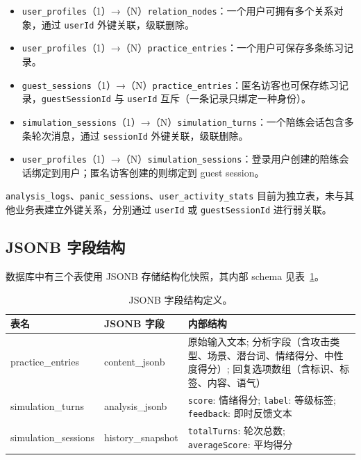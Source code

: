 \begin{itemize}
  \item \texttt{user\_profiles}（1）→（N）\texttt{relation\_nodes}：一个用户可拥有多个关系对象，通过 \texttt{userId} 外键关联，级联删除。
  \item \texttt{user\_profiles}（1）→（N）\texttt{practice\_entries}：一个用户可保存多条练习记录。
  \item \texttt{guest\_sessions}（1）→（N）\texttt{practice\_entries}：匿名访客也可保存练习记录，\texttt{guestSessionId} 与 \texttt{userId} 互斥（一条记录只绑定一种身份）。
  \item \texttt{simulation\_sessions}（1）→（N）\texttt{simulation\_turns}：一个陪练会话包含多条轮次消息，通过 \texttt{sessionId} 外键关联，级联删除。
  \item \texttt{user\_profiles}（1）→（N）\texttt{simulation\_sessions}：登录用户创建的陪练会话绑定到用户；匿名访客创建的则绑定到 guest session。
\end{itemize}

\texttt{analysis\_logs}、\texttt{panic\_sessions}、\texttt{user\_activity\_stats} 目前为独立表，未与其他业务表建立外键关系，分别通过 \texttt{userId} 或 \texttt{guestSessionId} 进行弱关联。

\subsection{JSONB 字段结构}

数据库中有三个表使用 JSONB 存储结构化快照，其内部 schema 见表~\ref{tab:jsonb-schemas}。

\begin{table}[H]
  \centering
  \caption{JSONB 字段结构定义。}
  \label{tab:jsonb-schemas}
  \begin{tabularx}{\textwidth}{>{\raggedright\arraybackslash}p{3cm} >{\raggedright\arraybackslash}p{3cm} >{\raggedright\arraybackslash}X}
    \toprule
    表名 & JSONB 字段 & 内部结构 \\
    \midrule
    practice\_entries & content\_jsonb & 原始输入文本; 分析字段（含攻击类型、场景、潜台词、情绪得分、中性度得分）; 回复选项数组（含标识、标签、内容、语气） \\
    simulation\_turns & analysis\_jsonb & \texttt{score}: 情绪得分; \texttt{label}: 等级标签; \texttt{feedback}: 即时反馈文本 \\
    simulation\_sessions & history\_snapshot & \texttt{totalTurns}: 轮次总数; \texttt{averageScore}: 平均得分 \\
    \bottomrule
  \end{tabularx}
\end{table}

